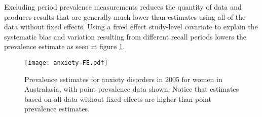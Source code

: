 Excluding period prevalence measurements reduces the quantity of data and produces results that are generally much lower than estimates using all of the data without fixed effects.  Using a fixed effect study-level covariate to explain the systematic bias and variation resulting from different recall periods lowers the prevalence estimate as seen in figure \ref{fig:app-anxiety FE}.

    \begin{figure}[h]
        \begin{center}
            \texttt{[image: anxiety-FE.pdf]}
            \caption{Prevalence estimates for anxiety disorders in 2005 for women in Australasia, with point prevalence data shown.  Notice that estimates based on all data without fixed effects are higher than point prevalence estimates.}
            \label{fig:app-anxiety FE}
        \end{center}
    \end{figure}

